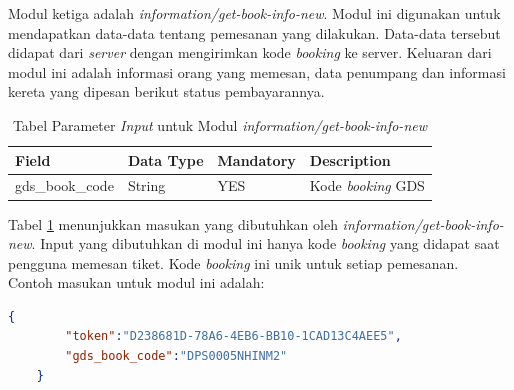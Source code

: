 Modul ketiga adalah \textit{information/get-book-info-new}. Modul ini digunakan untuk mendapatkan data-data tentang pemesanan yang dilakukan. Data-data tersebut didapat dari \textit{server} dengan mengirimkan kode \textit{booking} ke server. Keluaran dari modul ini adalah informasi orang yang memesan, data penumpang dan informasi kereta yang dipesan berikut status pembayarannya.

\begin{table}[H]
	\centering 
	\caption{Tabel Parameter \textit{Input} untuk Modul \textit{information/get-book-info-new}}
	\label{tab:getbookinfoinput}
	\begin{tabular}{|l|l|l|l|}
		\hline
		Field & Data Type & Mandatory & Description\\
		\hline
		
		\hline
        gds\_book\_code & String & YES & Kode \textit{booking} GDS\\
        \hline
	\end{tabular} 
\end{table}

Tabel \ref{tab:getbookinfoinput} menunjukkan masukan yang dibutuhkan oleh \textit{information/get-book-info-new}. Input yang dibutuhkan di modul ini hanya kode \textit{booking} yang didapat saat pengguna memesan tiket. Kode \textit{booking} ini unik untuk setiap pemesanan.\\

Contoh masukan untuk modul ini adalah:

\begin{lstlisting}[language=json]
    {
        "token":"D238681D-78A6-4EB6-BB10-1CAD13C4AEE5",
        "gds_book_code":"DPS0005NHINM2"
    }
\end{lstlisting}

